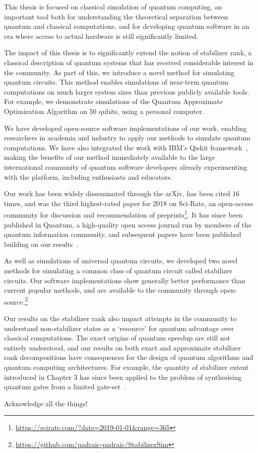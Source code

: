 \begin{impactstatement}
This thesis is focused on classical simulation of quantum computing, an important tool both for understanding the theoretical separation between quantum and classical computations, and for developing quantum software in an era where access to actual hardware is still significantly limited.\par
The impact of this thesis is to significantly extend the notion of stabilizer rank, a classical description of quantum systems that has received considerable interest in the community. As part of this, we introduce a novel method for simulating quantum circuits. This method enables simulations of near-term quantum computations on much larger system sizes than previous publicly available tools. For example, we demonstrate simulations of the Quantum Approximate Optimization Algorithm on $50$ qubits, using a personal computer.\par
We have developed open-source software implementations of our work, enabling researchers in academia and industry to apply our methods to simulate quantum computations. We have also integrated the work with IBM's Qiskit framework~\cite{Qiskit}, making the benefits of our method immediately available to the large international community of quantum software developers already experimenting with the platform, including enthusiasts and educators.\par
Our work has been widely disseminated through the arXiv, has been cited $16$ times, and was the third highest-rated paper for 2018 on Sci-Rate, an open-access community for discussion and recommendation of preprints\footnote{\url{https://scirate.com/?date=2019-01-01&range=365}}. It has since been published in Quantum, a high-quality open access journal run by members of the quantum information community, and subsequent papers have been published building on our results~\cite{Qassim2019,Yifei2019}.\par
As well as simulations of universal quantum circuits, we developed two novel methods for simulating a common class of quantum circuit called stabilizer circuits. Our software implementations show generally better performance than current popular methods, and are available to the community through open-source.\footnote{\url{https://github.com/padraic-padraic/StabilizerSim}}\par
Our results on the stabilizer rank also impact attempts in the community to understand non-stabilizer states as a `resource' for quantum advantage over classical computations. The exact origins of quantum speedup are still not entirely understood, and our results on both exact and approximate stabilizer rank decompositions have consequences for the design of quantum algorithms and quantum computing architectures. For example, the quantity of stabilizer extent introduced in Chapter 3 has since been applied to the problem of synthesising quantum gates from a limited gate-set~\cite{Beverland2019}.
\end{impactstatement}

\begin{acknowledgements}
Acknowledge all the things!
\end{acknowledgements}

\setcounter{tocdepth}{2} 

\tableofcontents
% 


